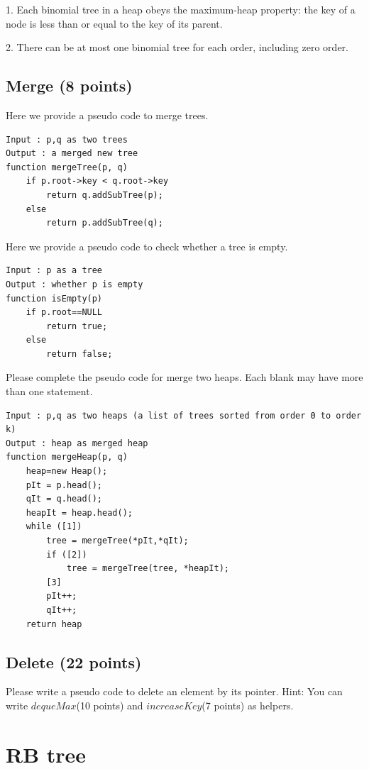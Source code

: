 \documentclass[11pt]{exam}
\begin{document}
1. Each binomial tree in a heap obeys the maximum-heap property: the key of a node is less than or equal to the key of its parent.

2. There can be at most one binomial tree for each order, including zero order.


\subsection{Merge (8 points)}

Here we provide a pseudo code to merge trees.
\begin{lstlisting}[]
Input : p,q as two trees
Output : a merged new tree 
function mergeTree(p, q)
    if p.root->key < q.root->key
        return q.addSubTree(p);
    else
        return p.addSubTree(q);   
\end{lstlisting}
Here we provide a pseudo code to check whether a tree is empty.
\begin{lstlisting}[]
Input : p as a tree
Output : whether p is empty
function isEmpty(p)
    if p.root==NULL 
        return true;
    else
        return false;
\end{lstlisting}

Please complete the pseudo code for merge two heaps. Each blank may have more than one statement.
\begin{lstlisting}[]
Input : p,q as two heaps (a list of trees sorted from order 0 to order k)
Output : heap as merged heap
function mergeHeap(p, q)
    heap=new Heap();
    pIt = p.head();
    qIt = q.head();
    heapIt = heap.head();
    while ([1])
        tree = mergeTree(*pIt,*qIt);
        if ([2])
            tree = mergeTree(tree, *heapIt);
        [3]
        pIt++;
        qIt++;
    return heap
\end{lstlisting}
\begin{solution}
\end{solution}
\subsection{Delete (22 points)}
Please write a pseudo code to delete an element by its pointer. Hint: You can write $dequeMax$(10 points) and $increaseKey$(7 points) as helpers.
\begin{solution}
\end{solution}
\section{RB tree}
\end{document}
